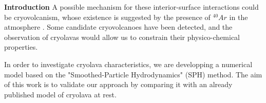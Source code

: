 \documentclass[final,t]{beamer}
\begin{document}
\begin{frame}
\begin{block}{\textbf{Introduction}}
A possible mechanism for these interior-surface interactions could be cryovolcanism, whose existence is suggested by the presence of $^{40}Ar$ in the atmosphere \cite{nixon}. Some candidate cryovolcanoes have been detected, and the observation of cryolavas would allow us to constrain their physico-chemical properties.

In order to investigate cryolava characteristics, we are developping a numerical model based on the "Smoothed-Particle Hydrodynamics" (SPH) method. The aim of this work is to validate our approach by comparing it with an already published model of cryolava at rest. %
\end{block}

\vspace{-1cm }

\begin{columns}[t]

  \begin{column}{.495\linewidth}



\end{column}
\end{columns}
\end{frame}
\end{document}
